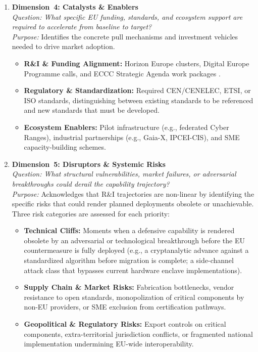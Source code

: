 \documentclass{ieeeaccess}
\begin{document}
\begin{enumerate}
    \item \textbf{Dimension~4: Catalysts \& Enablers}\\
    \textit{Question: What specific EU funding, standards, and ecosystem support
    are required to accelerate from baseline to target?}\\
    \textit{Purpose:} Identifies the concrete pull mechanisms and investment
    vehicles needed to drive market adoption.
    \begin{itemize}
        \item \textbf{R\&I \& Funding Alignment:} Horizon Europe clusters,
        Digital Europe Programme calls, and ECCC Strategic Agenda work
        packages \cite{eccc}.
        \item \textbf{Regulatory \& Standardization:} Required CEN/CENELEC,
        ETSI, or ISO standards, distinguishing between existing standards to
        be referenced and new standards that must be developed.
        \item \textbf{Ecosystem Enablers:} Pilot infrastructure (e.g.,
        federated Cyber Ranges), industrial partnerships (e.g., Gaia-X,
        IPCEI-CIS), and SME capacity-building schemes.
    \end{itemize}

    \item \textbf{Dimension~5: Disruptors \& Systemic Risks}\\
    \textit{Question: What structural vulnerabilities, market failures, or
    adversarial breakthroughs could derail the capability trajectory?}\\
    \textit{Purpose:} Acknowledges that R\&I trajectories are non-linear by
    identifying the specific risks that could render planned deployments
    obsolete or unachievable. Three risk categories are assessed for each
    priority:
    \begin{itemize}
        \item \textbf{Technical Cliffs:} Moments when a defensive capability
        is rendered obsolete by an adversarial or technological breakthrough
        before the EU countermeasure is fully deployed (e.g., a cryptanalytic
        advance against a standardized algorithm before migration is complete;
        a side-channel attack class that bypasses current hardware enclave
        implementations).
        \item \textbf{Supply Chain \& Market Risks:} Fabrication bottlenecks,
        vendor resistance to open standards, monopolization of critical
        components by non-EU providers, or SME exclusion from certification
        pathways.
        \item \textbf{Geopolitical \& Regulatory Risks:} Export controls on
        critical components, extra-territorial jurisdiction conflicts, or
        fragmented national implementation undermining EU-wide interoperability.
    \end{itemize}


\end{enumerate}
\end{document}
